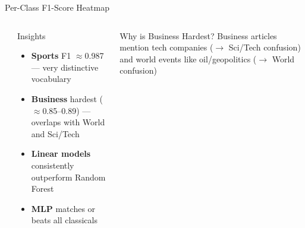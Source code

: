 \documentclass[aspectratio=169,11pt]{beamer}
\begin{document}
\begin{frame}{Per-Class F1-Score Heatmap}
\begin{columns}[T]
\begin{center}
{%
    }%
    \end{center}
    \begin{block}{Insights}
      \footnotesize
      \begin{itemize}
        \item \textbf{Sports} F1 $\approx$0.987 --- very distinctive vocabulary
        \item \textbf{Business} hardest ($\approx$0.85--0.89) --- overlaps with World and Sci/Tech
        \item \textbf{Linear models} consistently outperform Random Forest
        \item \textbf{MLP} matches or beats all classicals
      \end{itemize}
    \end{block}
    \vspace{4pt}
    \begin{alertblock}{Why is Business Hardest?}
      \footnotesize
      Business articles mention tech companies ($\to$ Sci/Tech confusion) and world events like oil/geopolitics ($\to$ World confusion)
    \end{alertblock}
\end{columns}
\end{frame}
\end{document}
